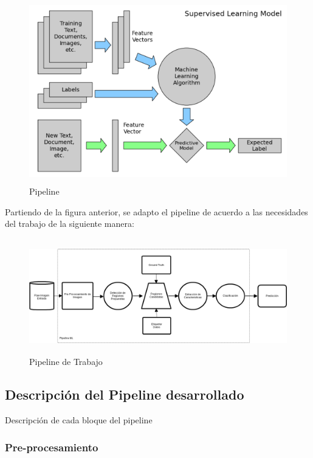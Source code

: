 \begin{figure}[H] \centering
  \includegraphics[height=8cm,keepaspectratio=true,clip=true]{imagenes/tbd/pipeline-sp.png}
  \caption{Pipeline}\label{Fig:pipeline}
\end{figure}

Partiendo de la figura anterior, se adapto el pipeline de acuerdo a las necesidades del trabajo de la siguiente manera:

\begin{figure}[H] \centering
  \includegraphics[height=5cm,keepaspectratio=true,clip=true]{imagenes/tbd/pipeline.png}
  \caption{Pipeline de Trabajo}\label{Fig:pipeline-mio}
\end{figure}

\subsection{Descripción del Pipeline desarrollado}\label{sub:desc-pipeline}
Descripción de cada bloque del pipeline

\subsubsection*{Pre-procesamiento}

